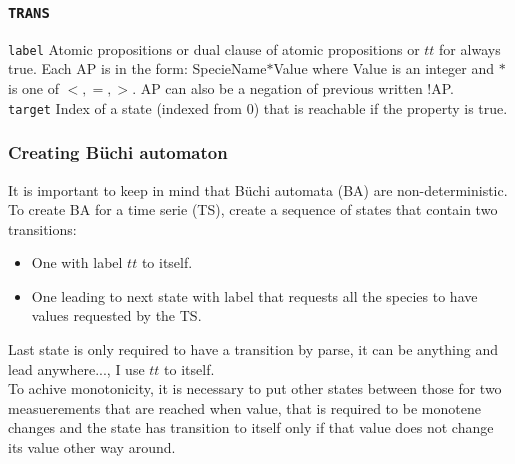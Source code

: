 \documentclass[12pt]{article}
\begin{document}
\subsubsection {\texttt{TRANS}}
\texttt{label} Atomic propositions or dual clause of atomic propositions or $tt$ for always true. Each AP is in the form: SpecieName$*$Value where Value is an integer and $*$ is one of $<,=,>$. AP can also be a negation of previous written !AP. \\
\texttt{target} Index of a state (indexed from 0) that is reachable if the property is true.

\subsubsection {Creating B\"{u}chi automaton}
It is important to keep in mind that B\"{u}chi automata (BA) are non-deterministic. \\
To create BA for a time serie (TS), create a sequence of states that contain two transitions:
\begin{itemize}
\item One with label $tt$ to itself.
\item One leading to next state with label that requests all the species to have values requested by the TS.
\end{itemize}
Last state is only required to have a transition by parse, it can be anything and lead anywhere..., I use $tt$ to itself. \\
To achive monotonicity, it is necessary to put other states between those for two measuerements that are reached when value, that is required to be monotene changes and the state has transition to itself only if that value does not change its value other way around.
\end{document}
